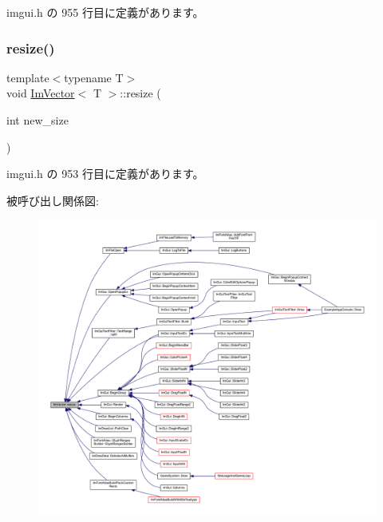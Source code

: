  imgui.\+h の 955 行目に定義があります。

\mbox{\label{class_im_vector_ac371dd62e56ae486b1a5038cf07eee56}} 
\subsubsection{\texorpdfstring{resize()}{resize()}\hspace{0.1cm}{\footnotesize\ttfamily [1/2]}}
{\footnotesize\ttfamily template$<$typename T$>$ \\
void \mbox{\hyperlink{class_im_vector}{Im\+Vector}}$<$ T $>$\+::resize (\begin{DoxyParamCaption}\item[{int}]{new\+\_\+size }\end{DoxyParamCaption})\hspace{0.3cm}{\ttfamily [inline]}}



 imgui.\+h の 953 行目に定義があります。

被呼び出し関係図\+:\nopagebreak
\begin{figure}[H]
\begin{center}
\leavevmode
\includegraphics[width=350pt]{class_im_vector_ac371dd62e56ae486b1a5038cf07eee56_icgraph}
\end{center}
\end{figure}
\mbox{\label{class_im_vector_abe7f21776ecfb7d0214963fd8c0689f0}} 
